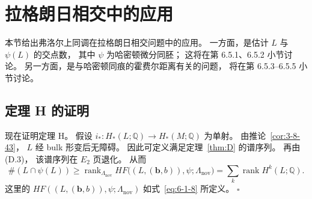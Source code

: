 
\section{拉格朗日相交中的应用}
\label{sec:6-5}

本节给出弗洛尔上同调在拉格朗日相交问题中的应用。
一方面，是估计 $L$ 与 $\psi(L)$ 的交点数，
其中 $\psi$ 为哈密顿微分同胚；
这将在第 6.5.1、6.5.2 小节讨论。
另一方面，是与哈密顿同痕的霍费尔距离有关的问题，
将在第 6.5.3--6.5.5 小节讨论。

\subsection{定理 H 的证明}
\label{subsec:6-5-1}

现在证明定理 H。
假设
$i_*:H_*(L;\mathbb Q)\to H_*(M;\mathbb Q)$
为单射。
由推论~\ref{cor:3-8-43}，
$L$ 经 bulk 形变后无障碍。
因此可定义满足定理~\ref{thm:D} 的谱序列。
再由 \textup{(D.3)}，
该谱序列在 $E_2$ 页退化。
从而
\[
\#(L\cap\psi(L))
\geq
\operatorname{rank}_{\Lambda_{\mathrm{nov}}}
HF\bigl((L,(\boldsymbol b,b)),\psi;\Lambda_{\mathrm{nov}}\bigr)
=\sum_k\operatorname{rank}H^k(L;\mathbb Q).
\]
这里的
$HF((L,(\boldsymbol b,b)),\psi;\Lambda_{\mathrm{nov}})$
如式~\eqref{eq:6-1-8} 所定义。
\hfill$\square$
